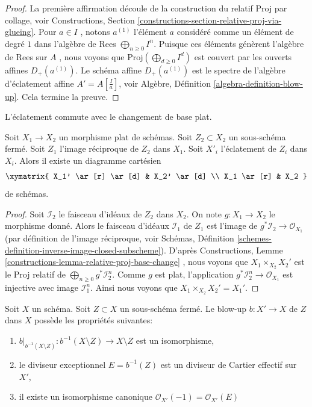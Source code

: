 \begin{proof}
La première affirmation découle de la construction du relatif Proj par collage,
voir Constructions, Section  \ref{constructions-section-relative-proj-via-glueing}. Pour  $a \in I$ , notons  $a^{(1)}$ 
l'élément  $a$  considéré comme un élément de degré  $1$  dans
l'algèbre de Rees  $\bigoplus_{n \geq 0} I^n$. Puisque ces éléments génèrent l'algèbre de Rees
sur  $A$ , nous voyons que  $\text{Proj}(\bigoplus_{d \geq 0} I^d)$  est couvert par les ouverts affines
 $D_{+}(a^{(1)})$. Le schéma affine  $D_{+}(a^{(1)})$  est le spectre de l'algèbre d'éclatement
affine  $A' = A[\frac{I}{a}]$, voir Algèbre, Définition  \ref{algebra-definition-blow-up}. Cela termine la
preuve.
\end{proof}

\begin{lemma}
\label{lemma-flat-base-change-blowing-up}
\begin{slogan}
L'éclatement commute avec le changement de base plat.
\end{slogan}
Soit  $X_1 \to X_2$  un morphisme plat de schémas. Soit  $Z_2 \subset X_2$  un sous-schéma
fermé. Soit  $Z_1$  l'image réciproque de  $Z_2$  dans  $X_1$.
Soit  $X'_i$  l'éclatement de  $Z_i$  dans  $X_i$. Alors il existe un
diagramme cartésien
$$
\xymatrix{
X_1' \ar[r] \ar[d] & X_2' \ar[d] \\
X_1 \ar[r] & X_2
}
$$
de schémas.
\end{lemma}

\begin{proof}
Soit  $\mathcal{I}_2$  le faisceau d'idéaux de  $Z_2$  dans  $X_2$. On note
 $g : X_1 \to X_2$  le morphisme donné. Alors le faisceau d'idéaux  $\mathcal{I}_1$  de
 $Z_1$  est l'image de  $g^*\mathcal{I}_2 \to \mathcal{O}_{X_1}$  (par définition de l'image réciproque,
voir Schémas, Définition  \ref{schemes-definition-inverse-image-closed-subscheme}). D'après Constructions, Lemme  \ref{constructions-lemma-relative-proj-base-change} ,
nous voyons que  $X_1 \times_{X_2} X_2'$  est le Proj relatif de  $\bigoplus_{n \geq 0} g^*\mathcal{I}_2^n$. Comme
 $g$  est plat, l'application  $g^*\mathcal{I}_2^n \to \mathcal{O}_{X_1}$  est injective avec image
 $\mathcal{I}_1^n$. Ainsi nous voyons que  $X_1 \times_{X_2} X_2' = X_1'$.
\end{proof}

\begin{lemma}
\label{lemma-blowing-up-gives-effective-Cartier-divisor}
Soit  $X$  un schéma. Soit  $Z \subset X$  un sous-schéma fermé. Le blow-up
 $b : X' \to X$  de  $Z$  dans  $X$  possède les propriétés suivantes:
\begin{enumerate}
\item $b|_{b^{-1}(X \setminus Z)} : b^{-1}(X \setminus Z) \to X \setminus Z$  est un isomorphisme,
\item le diviseur exceptionnel  $E = b^{-1}(Z)$  est un diviseur de Cartier effectif sur
 $X'$,
\item il existe un isomorphisme canonique  $\mathcal{O}_{X'}(-1) = \mathcal{O}_{X'}(E)$
\end{enumerate}
\end{lemma}

